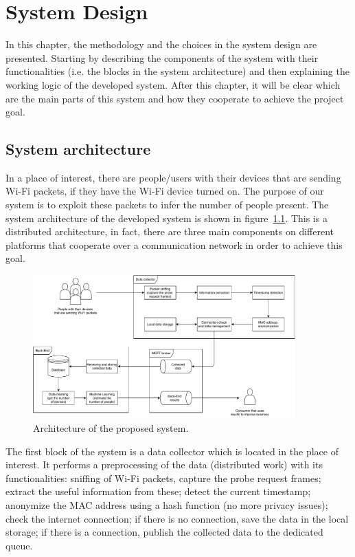 \chapter{System Design}
\label{cha:system}
\vspace{0.4 cm} 

In this chapter, the methodology and the choices in the system design are presented. Starting by describing the components of the system with their functionalities (i.e. the blocks in the system architecture) and then explaining the working logic of the developed system. After this chapter, it will be clear which are the main parts of this system and how they cooperate to achieve the project goal.



\section{System architecture}
\label{sec:sysarc}
\vspace{0.2 cm} 

In a place of interest, there are people/users with their devices that are sending Wi-Fi packets, if they have the Wi-Fi device turned on. The purpose of our system is to exploit these packets to infer the number of people present. The system architecture of the developed system is shown in figure~\ref{fig:architecture}.
This is a distributed architecture, in fact, there are three main components on different platforms that cooperate over a communication network in order to achieve this goal.

\begin{figure}[h]
\centering 
\includegraphics[width=0.9\textwidth]{images/architecture} 
\caption{Architecture of the proposed system.}
\label{fig:architecture}
\end{figure}

The first block of the system is a data collector which is located in the place of interest. It performs a preprocessing of the data (distributed work) with its functionalities: sniffing of Wi-Fi packets, capture the probe request frames; extract the useful information from these; detect the current timestamp; anonymize the MAC address using a hash function (no more privacy issues); check the internet connection; if there is no connection, save the data in the local storage; if there is a connection, publish the collected data to the dedicated queue.

